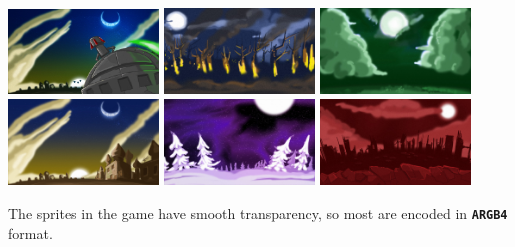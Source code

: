 \documentclass[10pt]{book}
\newcommand{\mach}[1]{\texttt{\textbf{#1}}}
\begin{document}
\begin{CJK}{UTF8}{gkai}
\begin{center}
\includegraphics[width=0.3\textwidth]{assets/nightstrike/backgrounds/welcome.jpg}
\includegraphics[width=0.3\textwidth]{assets/nightstrike/backgrounds/burningwoods.jpg}
\includegraphics[width=0.3\textwidth]{assets/nightstrike/backgrounds/greenland.jpg}
\includegraphics[width=0.3\textwidth]{assets/nightstrike/backgrounds/nightfall.jpg}
\includegraphics[width=0.3\textwidth]{assets/nightstrike/backgrounds/purplesnow.jpg}
\includegraphics[width=0.3\textwidth]{assets/nightstrike/backgrounds/redworld.jpg}
\end{center}

\newpage

The sprites in the game have smooth transparency, so most are encoded in \mach{ARGB4} format.


\end{CJK}
\end{document}

